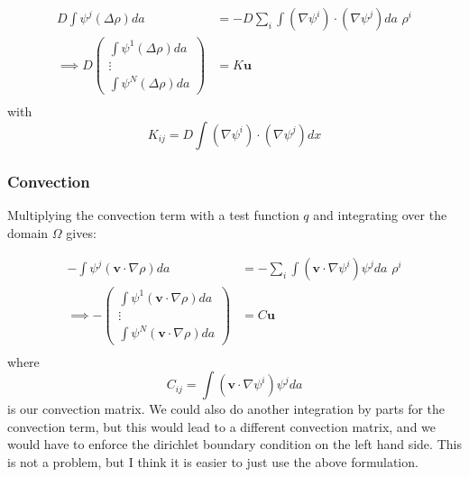 \begin{equation*}
    \begin{aligned}
        D\int \psi^j(\Delta\rho)da &= -D \sum_i \int (\nabla \psi^i)\cdot(\nabla\psi^j)da \,\,\rho^i \\
        \implies 
        D\begin{pmatrix}
            \int \psi^1(\Delta\rho)da \\
            \vdots \\
            \int \psi^N(\Delta\rho)da
        \end{pmatrix}&= K\mathbf{u}\\
    \end{aligned}
\end{equation*}
with
\begin{equation}\label{eq:diffusion_matrix}
K_{ij}=D\int (\nabla \psi^i)\cdot(\nabla\psi^j)dx
\end{equation}

\subsubsection*{Convection}
Multiplying the convection term with a test function $q$ and integrating over the domain $\Omega$ gives:

\begin{equation*}
    \begin{aligned}
        -\int \psi^j(\mathbf{v}\cdot\nabla\rho)da &= -\sum_i \int (\mathbf{v}\cdot\nabla\psi^i)\psi^j da \,\,\rho^i \\
        \implies 
        -\begin{pmatrix}
            \int \psi^1(\mathbf{v}\cdot\nabla\rho)da \\
            \vdots \\
            \int \psi^N(\mathbf{v}\cdot\nabla\rho)da
        \end{pmatrix}&= C\mathbf{u}\\
    \end{aligned}
\end{equation*}
where
\begin{equation}\label{eq:convection_matrix}
C_{ij}=\int (\mathbf{v}\cdot\nabla\psi^i)\psi^j da
\end{equation}
is our convection matrix. We could also do another integration by parts for the convection term, but this would lead to a different convection matrix, and we would have to enforce the dirichlet boundary condition on the left hand side. This is not a problem, but I think it is easier to just use the above formulation.

